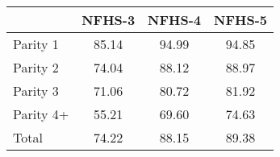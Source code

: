 \begin{tabular}{l*{3}{c}}
\toprule
            &\multicolumn{1}{c}{NFHS-3}&\multicolumn{1}{c}{NFHS-4}&\multicolumn{1}{c}{NFHS-5}\\
\midrule
\midrule
Parity 1    &       85.14&       94.99&       94.85\\
Parity 2    &       74.04&       88.12&       88.97\\
Parity 3    &       71.06&       80.72&       81.92\\
Parity 4+   &       55.21&       69.60&       74.63\\
Total       &       74.22&       88.15&       89.38\\
\bottomrule
\end{tabular}
